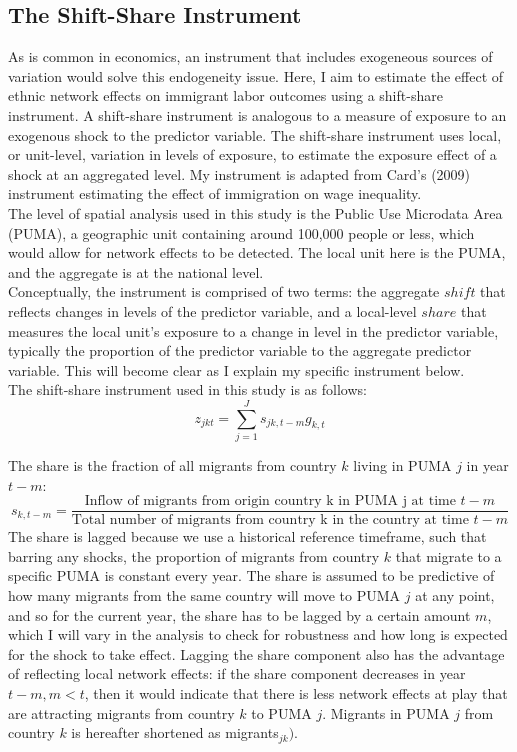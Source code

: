 \documentclass[11pt]{article}
\begin{document}
\subsection{The Shift-Share Instrument}
As is common in economics, an instrument that includes exogeneous sources of variation would solve this endogeneity issue. Here, I aim to estimate the effect of ethnic network effects on immigrant labor outcomes using a shift-share instrument. A shift-share instrument is analogous to a measure of exposure to an exogenous shock to the predictor variable. The shift-share instrument uses local, or unit-level, variation in levels of exposure, to estimate the exposure effect of a shock at an aggregated level. My instrument is adapted from Card's (2009) instrument estimating the effect of immigration on wage inequality. \\

The level of spatial analysis used in this study is the Public Use Microdata Area (PUMA), a geographic unit containing around 100,000 people or less, which would allow for network effects to be detected. The local unit here is the PUMA, and the aggregate is at the national level. \\

Conceptually, the instrument is comprised of two terms: the aggregate $shift$ that reflects changes in levels of the predictor variable, and a local-level $share$ that measures the local unit's exposure to a change in level in the predictor variable, typically the proportion of the predictor variable to the aggregate predictor variable. This will become clear as I explain my specific instrument below.\\

The shift-share instrument used in this study is as follows:
\begin{equation}
    z_{jkt}=\sum^J_{j=1}s_{jk,t-m}g_{k,t}
\end{equation}

The share is the fraction of all migrants from country $k$ living in PUMA $j$ in year $t-m$: 
\begin{equation*}
    s_{k,t-m}=\frac{\text{Inflow of migrants from origin country k in PUMA j at time $t-m$}}{\text{Total number of migrants from country k in the country at time $t-m$}}
\end{equation*}
The share is lagged because we use a historical reference timeframe, such that barring any shocks, the proportion of migrants from country $k$ that migrate to a specific PUMA is constant every year. The share is assumed to be predictive of how many migrants from the same country will move to PUMA $j$ at any point, and so for the current year, the share has to be lagged by a certain amount $m$, which I will vary in the analysis to check for robustness and how long is expected for the shock to take effect. Lagging the share component also has the advantage of reflecting local network effects: if the share component decreases in year $t-m, m<t$, then it would indicate that there is less network effects at play that are attracting migrants from country $k$ to PUMA $j$.  Migrants in PUMA $j$ from country $k$ is hereafter shortened as migrants$_{jk})$.\\
\end{document}
